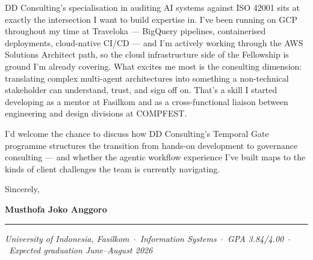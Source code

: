 \documentclass[11pt,a4paper]{article}
\begin{document}
DD Consulting's specialisation in auditing AI systems against ISO 42001 sits at exactly
the intersection I want to build expertise in. I've been running on GCP throughout my
time at Traveloka --- BigQuery pipelines, containerised deployments, cloud-native CI/CD
--- and I'm actively working through the AWS Solutions Architect path, so the cloud
infrastructure side of the Fellowship is ground I'm already covering. What excites me
most is the consulting dimension: translating complex multi-agent architectures into
something a non-technical stakeholder can understand, trust, and sign off on. That's a
skill I started developing as a mentor at Fasilkom and as a cross-functional liaison
between engineering and design divisions at COMPFEST.

I'd welcome the chance to discuss how DD Consulting's Temporal Gate programme structures
the transition from hands-on development to governance consulting --- and whether the
agentic workflow experience I've built maps to the kinds of client challenges the team
is currently navigating.

\vspace{10pt}
Sincerely,

\vspace{18pt}
\textbf{Musthofa Joko Anggoro}

\vspace{10pt}
\hrule
\vspace{6pt}
\footnotesize
\textit{University of Indonesia, Fasilkom\ $\cdot$\ Information Systems\ $\cdot$\ GPA 3.84/4.00\ $\cdot$\ Expected graduation June--August 2026}
\end{document}

